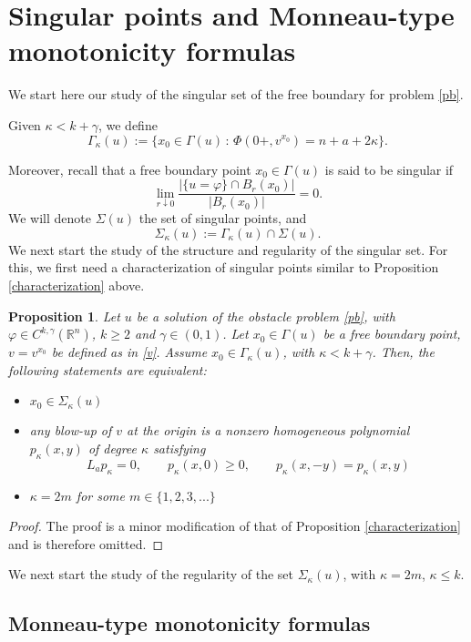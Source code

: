 \documentclass[11pt]{amsart}
\theoremstyle{plain}
\newtheorem{prop}[thrm]{Proposition}
\numberwithin{equation}{section}
\begin{document}
\section{Singular points and Monneau-type monotonicity formulas}
\label{sec7}

We start here our study of the singular set of the free boundary for problem \eqref{pb}.

Given $\kappa<k+\gamma$, we define
\[\Gamma_\kappa(u):=\{x_0\in \Gamma(u)\,:\, \Phi(0+,v^{x_0})=n+a+2\kappa\}.\]

Moreover, recall that a free boundary point $x_0\in \Gamma(u)$ is said to be singular if
\[\lim_{r\downarrow 0}\frac{\bigl|\{u=\varphi\}\cap B_r(x_0)\bigr|}{|B_r(x_0)|}=0.\]
We will denote $\Sigma(u)$ the set of singular points, and
\[\Sigma_\kappa(u):=\Gamma_\kappa(u)\cap \Sigma(u).\]
We next start the study of the structure and regularity of the singular set.
For this, we first need a characterization of singular points similar to Proposition \ref{characterization} above.

\begin{prop}
Let $u$ be a solution of the obstacle problem \eqref{pb}, with $\varphi\in C^{k,\gamma}({\mathbb R}^n)$,  $k\geq2$ and $\gamma\in(0,1)$.
Let $x_0\in \Gamma(u)$ be a free boundary point, $v=v^{x_0}$ be defined as in \eqref{v}.
Assume $x_0\in \Gamma_\kappa(u)$, with $\kappa<k+\gamma$.
Then, the following statements are equivalent:
\begin{itemize}
\item[(i)] $x_0\in \Sigma_\kappa(u)$
\item[(ii)] any blow-up of $v$ at the origin is a nonzero homogeneous polynomial $p_\kappa(x,y)$ of degree $\kappa$ satisfying
    \[L_ap_\kappa=0,\qquad p_\kappa(x,0)\geq0,\qquad p_\kappa(x,-y)=p_\kappa(x,y)\]
\item[(iii)] $\kappa=2m$ for some $m\in \{1,2,3,...\}$
\end{itemize}
\end{prop}

\begin{proof}
The proof is a minor modification of that of Proposition \ref{characterization} and is therefore omitted.
\end{proof}

We next start the study of the regularity of the set $\Sigma_\kappa(u)$, with $\kappa=2m$, $\kappa\leq k$.

\subsection{Monneau-type monotonicity formulas}
\end{document}
